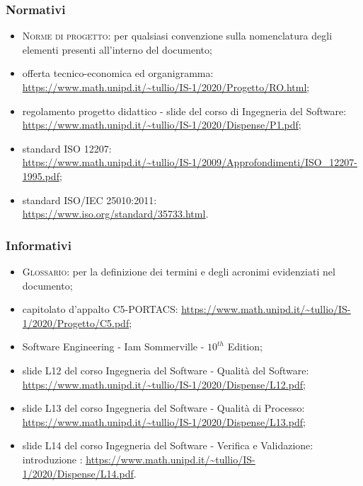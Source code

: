     \subsubsection{Normativi}
    \begin{itemize}
    	\item \textsc{Norme di progetto}: per qualsiasi convenzione sulla nomenclatura degli elementi presenti all'interno del documento;
    	\item offerta tecnico-economica ed organigramma: \newline  \uline{\url{https://www.math.unipd.it/~tullio/IS-1/2020/Progetto/RO.html}};
    	\item regolamento progetto didattico - slide del corso di Ingegneria del Software: \newline \uline{\url{https://www.math.unipd.it/~tullio/IS-1/2020/Dispense/P1.pdf}};
        \item standard ISO 12207:\\ \uline{\url{https://www.math.unipd.it/~tullio/IS-1/2009/Approfondimenti/ISO_12207-1995.pdf}};
        \item standard ISO/IEC 25010:2011:\\
        \uline{\url{https://www.iso.org/standard/35733.html}}.
    \end{itemize}

    \subsubsection{Informativi}
    \begin{itemize}
    	\item \textsc{Glossario}: per la definizione dei termini e degli acronimi evidenziati nel documento;
    	\item capitolato d'appalto C5-PORTACS: \newline
    	\uline{\url{https://www.math.unipd.it/~tullio/IS-1/2020/Progetto/C5.pdf}};
       	\item Software Engineering - Iam Sommerville - $10^{th}$ Edition;
        \item slide L12 del corso Ingegneria del Software - Qualità del Software:\newline
        \uline{\url{https://www.math.unipd.it/~tullio/IS-1/2020/Dispense/L12.pdf}};
        \item slide L13 del corso Ingegneria del Software - Qualità di Processo:\newline
        \uline{\url{https://www.math.unipd.it/~tullio/IS-1/2020/Dispense/L13.pdf}};
        \item slide L14 del corso Ingegneria del Software - Verifica e Validazione: introduzione :\newline
        \uline{\url{https://www.math.unipd.it/~tullio/IS-1/2020/Dispense/L14.pdf}}.
    \end{itemize}